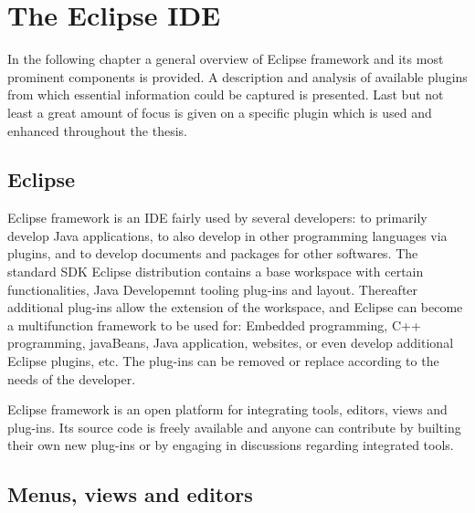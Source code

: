 \chapter{The Eclipse IDE}\label{cha:TheEclipseIDE}

In the following chapter a general overview of Eclipse framework and its most prominent components is provided. A description and analysis of available plugins from which essential information could be captured is presented. Last but not least a great amount of focus is given on a specific plugin which is used and enhanced throughout the thesis.  


\section{Eclipse}
\label{sec:TheEclipseIDE:eclipse}
Eclipse framework is an IDE fairly used by several developers: to primarily develop Java applications, to also develop in other programming languages via plugins, and to develop documents and packages for other softwares. 
The standard SDK Eclipse distribution contains a base workspace with certain functionalities, Java Developemnt tooling plug-ins and layout. Thereafter additional plug-ins allow the extension of the workspace, and Eclipse can become a multifunction framework to be used for: Embedded programming, C++ programming, javaBeans, Java application, websites, or even develop additional Eclipse plugins, etc. The plug-ins can be removed or replace according to the needs of the developer.

Eclipse framework is an open platform for integrating tools, editors, views and plug-ins. Its source code is freely available and anyone can contribute by builting their own new plug-ins or by engaging in discussions regarding integrated tools. 

\section{Menus, views and editors}


